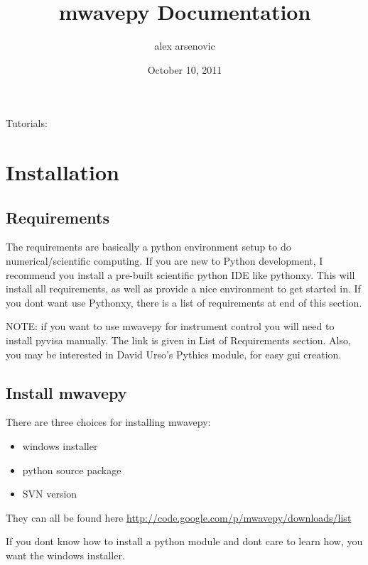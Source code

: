 \documentclass[letterpaper,10pt,english]{sphinxmanual}
\title{mwavepy Documentation}
\date{October 10, 2011}
\author{alex arsenovic}
\begin{document}
\maketitle
\tableofcontents
{}\label{index::doc}


Tutorials:


\chapter{Installation}
\label{installation:mwavepy-s-documentation}\label{installation::doc}\label{installation:installation}\label{installation:id1}

\section{Requirements}
\label{installation:requirements}
The requirements are basically a python environment setup to do numerical/scientific computing. If you are new to Python development, I recommend you install a pre-built scientific python IDE like pythonxy. This will install all requirements, as well as provide a nice environment to get started in. If you dont want use Pythonxy, there is a list of requirements at end of this section.

NOTE: if you want to use mwavepy for instrument control you will need to install pyvisa manually. The link is given in List of Requirements section. Also, you may be interested in David Urso's Pythics module, for easy gui creation.


\section{Install mwavepy}
\label{installation:install-mwavepy}
There are three choices for installing mwavepy:
\begin{itemize}
\item {} 
windows installer

\item {} 
python source package

\item {} 
SVN version

\end{itemize}

They can all be found here \href{http://code.google.com/p/mwavepy/downloads/list}{http://code.google.com/p/mwavepy/downloads/list}

If you dont know how to install a python module and dont care to learn how, you want the windows installer.
\end{document}
